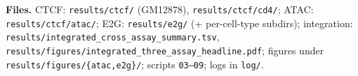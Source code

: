 \documentclass[11pt]{article}
\begin{document}
\vspace{1em}
\noindent\small\textbf{Files.} CTCF: \texttt{results/ctcf/} (GM12878), \texttt{results/ctcf/cd4/};
ATAC: \texttt{results/ctcf/atac/}; E2G: \texttt{results/e2g/} (+ per-cell-type subdirs);
integration: \texttt{results/integrated\_cross\_assay\_summary.tsv},
\texttt{results/figures/integrated\_three\_assay\_headline.pdf}; figures under
\texttt{results/figures/\{atac,e2g\}/}; scripts \texttt{03--09}; logs in \texttt{log/}.
\end{document}
